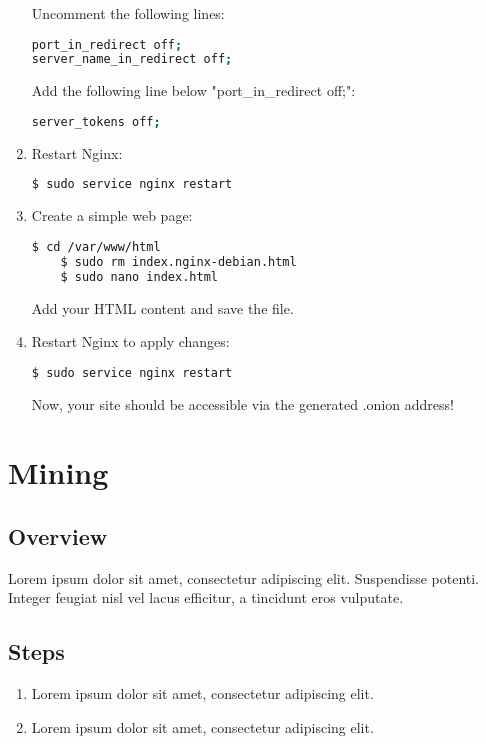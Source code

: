 \documentclass[a4paper,12pt]{article}
\begin{document}
\begin{enumerate}
Uncomment the following lines:
\begin{lstlisting}[language=bash, breaklines=true, columns=fullflexible]
port_in_redirect off;
server_name_in_redirect off;
\end{lstlisting}

Add the following line below "port\_in\_redirect off;":
\begin{lstlisting}[language=bash, breaklines=true, columns=fullflexible]
server_tokens off;
\end{lstlisting}

    \item Restart Nginx:
    \begin{lstlisting}[language=bash, breaklines=true, columns=fullflexible]
    $ sudo service nginx restart
    \end{lstlisting}

    \item Create a simple web page:
    \begin{lstlisting}[language=bash, breaklines=true, columns=fullflexible]
    $ cd /var/www/html
    $ sudo rm index.nginx-debian.html
    $ sudo nano index.html
    \end{lstlisting}
    Add your HTML content and save the file.

\item Restart Nginx to apply changes:
\begin{lstlisting}[language=bash, breaklines=true, columns=fullflexible]
$ sudo service nginx restart
\end{lstlisting}
Now, your site should be accessible via the generated .onion address!
   
\end{enumerate}

\section{Mining}

\subsection{Overview}
Lorem ipsum dolor sit amet, consectetur adipiscing elit. Suspendisse potenti. Integer feugiat nisl vel lacus efficitur, a tincidunt eros vulputate.

\subsection{Steps}
\begin{enumerate}
    \item Lorem ipsum dolor sit amet, consectetur adipiscing elit.
    \item Lorem ipsum dolor sit amet, consectetur adipiscing elit.
\end{enumerate}
\end{document}
